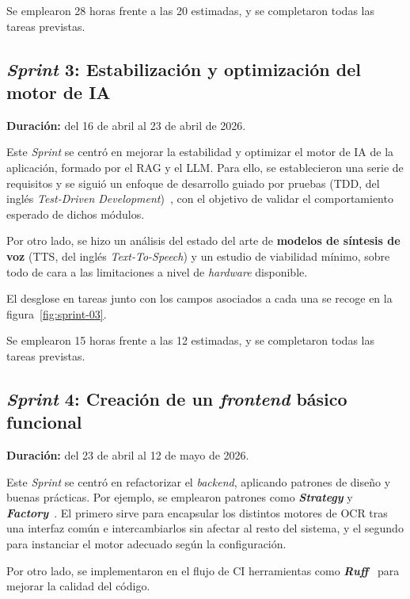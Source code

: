 
Se emplearon 28 horas frente a las 20 estimadas, y se completaron todas las
tareas previstas.

\subsection{\textit{Sprint} 3: Estabilización y optimización del motor de IA}
\textbf{Duración:} del 16 de abril al 23 de abril de 2026.

Este \textit{Sprint} se centró en mejorar la estabilidad y optimizar el motor de
\ac{IA} de la aplicación, formado por el \ac{RAG} y el \ac{LLM}. Para ello, se
establecieron una serie de requisitos y se siguió un enfoque de desarrollo guiado
por pruebas (\acs{TDD}, del inglés \textit{Test-Driven Development})~\cite{agile_alliance_tdd},
con el objetivo de validar el comportamiento esperado de dichos módulos.

Por otro lado, se hizo un análisis del estado del arte de \textbf{modelos de
síntesis de voz} (\acs{TTS}, del inglés \textit{Text-To-Speech}) y un
estudio de viabilidad mínimo, sobre todo de cara a las limitaciones a nivel de
\textit{hardware} disponible.

El desglose en tareas junto con los campos asociados a cada una se
recoge en la figura~\ref{fig:sprint-03}.


Se emplearon 15 horas frente a las 12 estimadas, y se completaron todas las
tareas previstas.

\subsection{\textit{Sprint} 4: Creación de un \textit{frontend} básico funcional}
\textbf{Duración:} del 23 de abril al 12 de mayo de 2026.

Este \textit{Sprint} se centró en refactorizar el \textit{backend}, aplicando
patrones de diseño y buenas prácticas. Por ejemplo, se emplearon patrones como \textbf{\textit{Strategy}} y \textbf{\textit{Factory}}~\cite{patterns}. El
primero sirve para encapsular los distintos motores de \ac{OCR} tras una interfaz
común e intercambiarlos sin afectar al resto del sistema, y el segundo para
instanciar el motor adecuado según la configuración.

Por otro lado, se implementaron en el flujo de \ac{CI} herramientas como
\textbf{\textit{Ruff}}~\cite{ruff} para mejorar la calidad del código.

